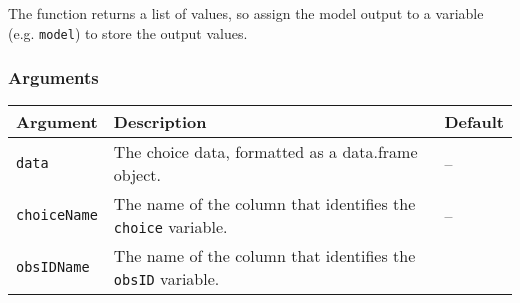 \documentclass[article]{jss}
\begin{document}
The function returns a list of values, so assign the model output to a
variable (e.g. \texttt{model}) to store the output values.

\hypertarget{arguments}{%
\subsubsection{Arguments}\label{arguments}}

\begin{longtable}[]{@{}lll@{}}
\toprule
\begin{minipage}[b]{0.14\columnwidth}\raggedright
Argument\strut
\end{minipage} & \begin{minipage}[b]{0.66\columnwidth}\raggedright
Description\strut
\end{minipage} & \begin{minipage}[b]{0.11\columnwidth}\raggedright
Default\strut
\end{minipage}\tabularnewline
\midrule
\endhead
\begin{minipage}[t]{0.14\columnwidth}\raggedright
\texttt{data}\strut
\end{minipage} & \begin{minipage}[t]{0.66\columnwidth}\raggedright
The choice data, formatted as a data.frame object.\strut
\end{minipage} & \begin{minipage}[t]{0.11\columnwidth}\raggedright
--\strut
\end{minipage}\tabularnewline
\begin{minipage}[t]{0.14\columnwidth}\raggedright
\texttt{choiceName}\strut
\end{minipage} & \begin{minipage}[t]{0.66\columnwidth}\raggedright
The name of the column that identifies the \texttt{choice}
variable.\strut
\end{minipage} & \begin{minipage}[t]{0.11\columnwidth}\raggedright
--\strut
\end{minipage}\tabularnewline
\begin{minipage}[t]{0.14\columnwidth}\raggedright
\texttt{obsIDName}\strut
\end{minipage} & \begin{minipage}[t]{0.66\columnwidth}\raggedright
The name of the column that identifies the \texttt{obsID}
variable.\strut
\end{minipage} & \begin{minipage}[t]{0.11\columnwidth}\raggedright

\end{minipage}
\end{longtable}
\end{document}
